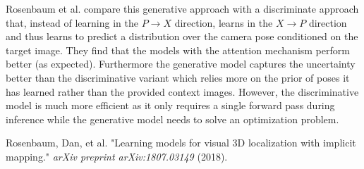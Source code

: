 \documentclass[12pt]{article}
\begin{document}
Rosenbaum et al. compare this generative approach with a discriminate approach that, instead of learning in the $P \rightarrow X$ direction, learns in the $X \rightarrow P$ direction and thus learns to predict a distribution over the camera pose conditioned on the target image. They find that the models with the attention mechanism perform better (as expected). Furthermore the generative model captures the uncertainty better than the discriminative variant which relies more on the prior of poses it has learned rather than the provided context images. However, the discriminative model is much more efficient as it only requires a single forward pass during inference while the generative model needs to solve an optimization problem. 




\begin{thebibliography}{9}
Rosenbaum, Dan, et al. "Learning models for visual 3D localization with implicit mapping." \emph{arXiv preprint arXiv:1807.03149} (2018).

\end{thebibliography}
 
\end{document}
